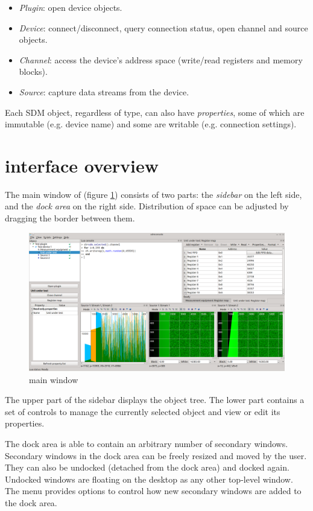 \documentclass[a4paper,12pt,twoside,extrafontsizes]{memoir}
\begin{document}
\begin{itemize}
	\item \emph{Plugin}: open device objects.
	\item \emph{Device}: connect/disconnect, query connection status, open channel and source objects.
	\item \emph{Channel}: access the device's address space (write/read registers and memory blocks).
	\item \emph{Source}: capture data streams from the device.
\end{itemize}

Each SDM object, regardless of type, can also have \emph{properties}, some of which are immutable (e.g. device name) and some are writable (e.g. connection settings).

\section[sdmconsole interface overview]{ interface overview}

The main window of  (figure \ref{fig:sdmconsolemain}) consists of two parts: the \emph{sidebar} on the left side, and the \emph{dock area} on the right side. Distribution of space can be adjusted by dragging the border between them.

\begin{figure}[htbp]
\centering
\includegraphics[scale=0.35]{images/sdmconsolemain.png}
\caption{ main window}
\label{fig:sdmconsolemain}
\end{figure}

The upper part of the sidebar displays the object tree. The lower part contains a set of controls to manage the currently selected object and view or edit its properties.

The dock area is able to contain an arbitrary number of secondary windows. Secondary windows in the dock area can be freely resized and moved by the user. They can also be undocked (detached from the dock area) and docked again. Undocked windows are floating on the desktop as any other top-level window. The  menu provides options to control how new secondary windows are added to the dock area.
\end{document}
